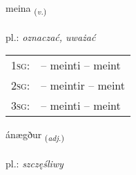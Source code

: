 \documentclass[frontgrid, backgrid]{flacards}\usepackage[]{graphicx}\usepackage[]{xcolor}
\begin{document}
\renewcommand{\flhead}{\vskip5pt \fboxsep=0pt {\small\bfseries\footnotesize Sagnorð | Verb}}
\renewcommand{\fcfoot}{\vskip5pt \fboxsep=0pt \hspace{2pt}{\small\bfseries\footnotesize 2K}}

\renewcommand{\blhead}{\vskip5pt {\small\bfseries\footnotesize Sagnorð | Verb }}
\renewcommand{\bcfoot}{\vskip5pt \hspace{2pt}{\small\bfseries\footnotesize 2K}}


{meina \small{\textsubscript{(\textit{v.})}} \\[1ex] %
\textphonetic{[meiːna]} \\
pl.: \emph{oznaczać, uważać} \\  [2ex]
\renewcommand*{\arraystretch}{0.8}
\begin{tabular}{p{1cm}l}
\textsc{1sg}: &  -- meinti -- meint \\ 
\textsc{2sg}: &  -- meintir -- meint \\ 
\textsc{3sg}: &  -- meinti -- meint \\ 
\end{tabular}
}

\renewcommand{\flhead}{\vskip5pt \fboxsep=0pt {\small\bfseries\footnotesize Lýsingarorð | Adjective}}
\renewcommand{\fcfoot}{\vskip5pt \fboxsep=0pt \hspace{2pt}{\small\bfseries\footnotesize 2K}}

\renewcommand{\blhead}{\vskip5pt {\small\bfseries\footnotesize Lýsingarorð | Adjective }}
\renewcommand{\bcfoot}{\vskip5pt \hspace{2pt}{\small\bfseries\footnotesize 2K}}


{ánægður \small{\textsubscript{(\textit{adj.})}} \\[1ex] %
\textphonetic{[auːnaiɣðʏr]} \\
pl.: \emph{szczęśliwy} \\  [2ex]
\renewcommand*{\arraystretch}{0.8}
}
\end{document}

